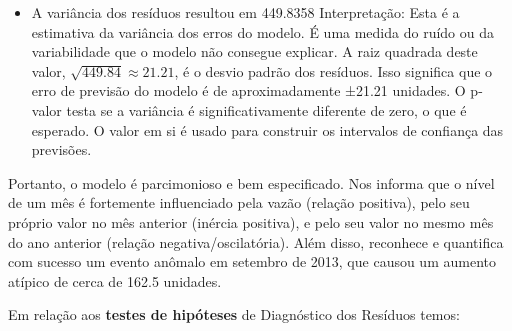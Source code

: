 \documentclass[ 12pt,a4paper ]{article} %
\begin{document}
\begin{itemize}
		\item A variância dos resíduos resultou em 449.8358
		Interpretação: Esta é a estimativa da variância dos erros do modelo. É uma medida do ruído ou da variabilidade que o modelo não consegue explicar. A raiz quadrada deste valor, 
		$\sqrt{449.84} \approx 21.21$, é o desvio padrão dos resíduos. Isso significa que o erro de previsão do modelo é de aproximadamente ±21.21 unidades.
		O p-valor testa se a variância é significativamente diferente de zero, o que é esperado. O valor em si é usado para construir os intervalos de confiança das previsões.
	\end{itemize}
	
	Portanto, o modelo é parcimonioso e bem especificado. Nos informa que o nível de um mês é fortemente influenciado pela vazão (relação positiva), pelo seu próprio valor no mês anterior (inércia positiva), e pelo seu valor no mesmo mês do ano anterior (relação negativa/oscilatória). Além disso, reconhece e quantifica com sucesso um evento anômalo em setembro de 2013, que causou um aumento atípico de cerca de 162.5 unidades.
	
	
	Em relação aos \textbf{testes de hipóteses} de Diagnóstico dos Resíduos temos:
	
\end{document}
